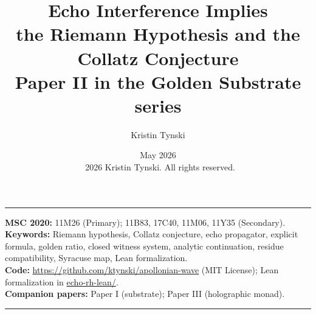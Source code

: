 \documentclass[11pt,a4paper]{article}
\title{Echo Interference Implies\\
the Riemann Hypothesis and the Collatz Conjecture\\[4pt]
{\large Paper II in the Golden Substrate series}}
\author{Kristin Tynski}
\date{May 2026 \\[6pt] {\small\textcopyright\ 2026 Kristin Tynski. All rights reserved.}}
\theoremstyle{plain}
\theoremstyle{definition}
\theoremstyle{remark}
\numberwithin{equation}{section}
\begin{document}
\thispagestyle{empty}
\maketitle

\vspace{-0.6em}
\begin{center}
{\color{accentMuted}\rule{0.55\textwidth}{0.5pt}}
\end{center}

\begin{center}
\footnotesize
\textbf{MSC 2020:} 11M26 (Primary); 11B83, 17C40, 11M06, 11Y35
(Secondary).\\
\textbf{Keywords:} Riemann hypothesis, Collatz conjecture, echo
propagator, explicit formula, golden ratio, closed witness system,
analytic continuation, residue compatibility, Syracuse map, Lean
formalization.\\
\textbf{Code:} \url{https://github.com/ktynski/apollonian-wave}
(MIT License); Lean formalization in
\url{echo-rh-lean/}.\\
\textbf{Companion papers:} Paper I (substrate); Paper III
(holographic monad).
\end{center}
\vspace{0.4em}
\begin{center}
{\color{accentMuted}\rule{0.55\textwidth}{0.5pt}}
\end{center}
\vspace{-0.3em}
\end{document}
